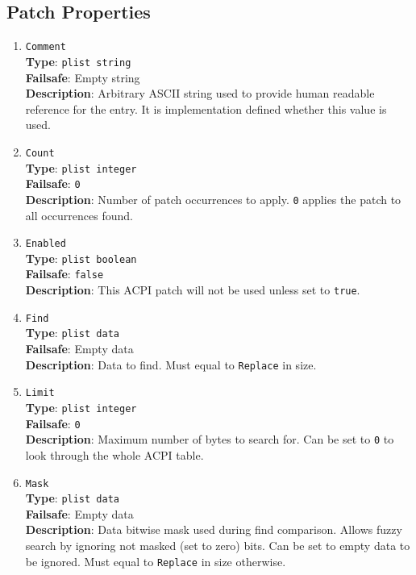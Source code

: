 \documentclass[]{article}
\makeatletter
\renewcommand{\label}[1]{%
\zref@wrapper@immediate{\oldlabel{#1}}}  %
\makeatother
\begin{document}
\subsection{Patch Properties}\label{acpipropspatch}

\begin{enumerate}

\item
  \texttt{Comment}\\
  \textbf{Type}: \texttt{plist\ string}\\
  \textbf{Failsafe}: Empty string\\
  \textbf{Description}: Arbitrary ASCII string used to provide human readable
  reference for the entry. It is implementation defined whether this value is
  used.

\item
  \texttt{Count}\\
  \textbf{Type}: \texttt{plist\ integer}\\
  \textbf{Failsafe}: \texttt{0}\\
  \textbf{Description}: Number of patch occurrences to apply. \texttt{0} applies
  the patch to all occurrences found.

\item
  \texttt{Enabled}\\
  \textbf{Type}: \texttt{plist\ boolean}\\
  \textbf{Failsafe}: \texttt{false}\\
  \textbf{Description}: This ACPI patch will not be used unless set to
  \texttt{true}.

\item
  \texttt{Find}\\
  \textbf{Type}: \texttt{plist\ data}\\
  \textbf{Failsafe}: Empty data\\
  \textbf{Description}: Data to find. Must equal to \texttt{Replace} in size.

\item
  \texttt{Limit}\\
  \textbf{Type}: \texttt{plist\ integer}\\
  \textbf{Failsafe}: \texttt{0}\\
  \textbf{Description}: Maximum number of bytes to search for. Can be set to
  \texttt{0} to look through the whole ACPI table.

\item
  \texttt{Mask}\\
  \textbf{Type}: \texttt{plist\ data}\\
  \textbf{Failsafe}: Empty data\\
  \textbf{Description}: Data bitwise mask used during find comparison.
  Allows fuzzy search by ignoring not masked (set to zero) bits. Can be
  set to empty data to be ignored. Must equal to \texttt{Replace} in size
  otherwise.


\end{enumerate}
\end{document}
